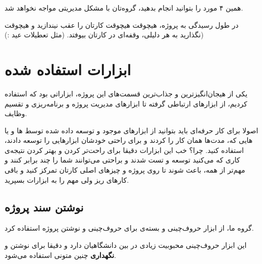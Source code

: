همین ۴ مورد را بتوانید انجام بدهید، گروه‌تان با مشکل مدیریتی مواجه نخواهد شد.

در طول رسیدگی به پروژه، هیچوقت هیچوقت کارتان را عقب نیندازید و هیچوقت نگذارید به هر دلیلی، وقفه‌‌ای در کارتان بیوفتد. (مثل تعطیلات عید :))
\section{ابزارات استفاده شده}
یکی از هیجان‌انگیزترین و جذاب‌ترین قسمت‌های این پروژه، ابزاراتی بود که استفاده کردیم، از ابزار‌های ارتباطی گرفته تا ابزار‌های مدیریت پروژه و برنامه‌ریزی و تقسیم وظایف.

اصولا برای کار حرفه‌ای باید بتوانید از ابزار‌های موجود و توسعه‌ داده شده توسط ها و یا هایی که، مدت‌ها همان کار را کردند و برای راحتی خودشان ابزار‌هایی را توسعه دادند، استفاده کنید. چرا؟ خب این ابزارات دقیقا برای راحت‌تر کردن و بهتر کردن نتیجه‌ی کاری که می‌کنید توسعه و تست شدند و براحتی می‌توانند  شما را چند برابر کنند و مهم‌تر از همه، باعث شوند تا روی پروژه و چیز‌های اصلی کارتان تمرکز کنید و باقی کار‌های ریز ولی مهم را به ابزارات بسپرید.

\subsection{نوشتن سند پروژه}
گروه ما، از ابزار حروف‌چینی 
\lr{\LaTeX }
و بسته‌ی 
\lr{\XePersian }
 برای حروف‌چینی و نوشتن پروژه استفاده کرد.
  
  این ابزار حروف‌چینی محبوبیت زیادی در بین دانشگاهیان دارد و دقیقا برای نوشتن و \textbf{نگهداری} چنین متونی استفاده می‌شود.
  
